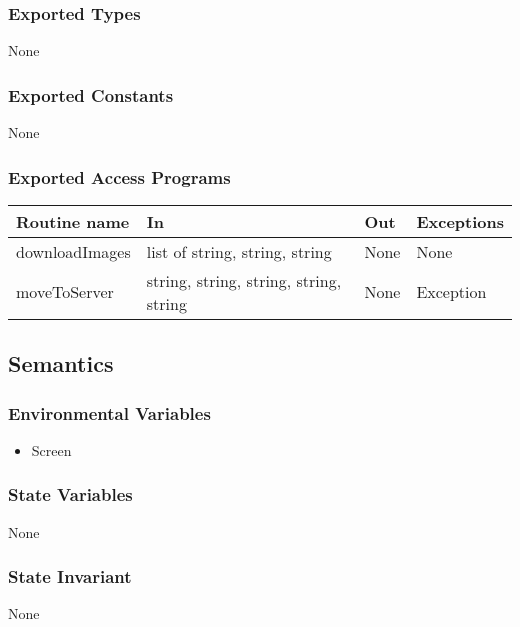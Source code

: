 \documentclass{article}
\begin{document}
\subsubsection* {Exported Types}

None

\subsubsection* {Exported Constants}

None

\subsubsection* {Exported Access Programs}

\begin{tabular}{| l | l | l | p{5cm} |}
\hline
\textbf{Routine name} & \textbf{In} & \textbf{Out} & \textbf{Exceptions}\\
\hline
downloadImages & list of string, string, string & None & None\\
moveToServer & string, string, string, string, string & None & Exception\\
\hline

\end{tabular}

\subsection* {Semantics}

\subsubsection* {Environmental Variables}

\begin{itemize}
\item Screen
\end{itemize}

\subsubsection* {State Variables}

None

\subsubsection* {State Invariant}

None
\end{document}
